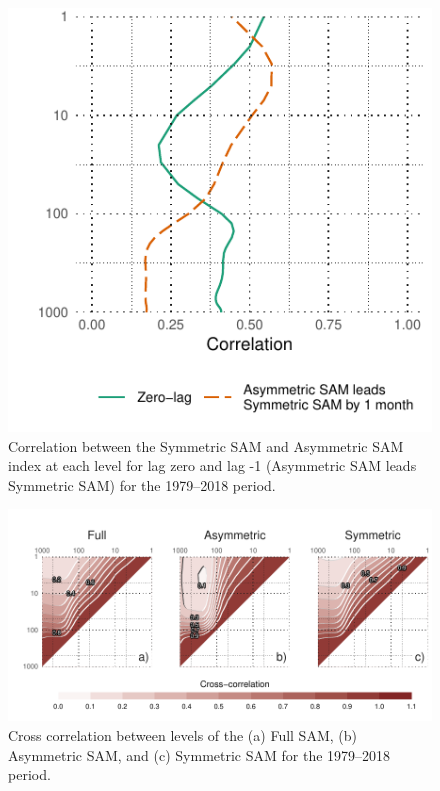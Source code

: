 \documentclass[]{ametsocV5}
\begin{document}
\begin{figure}
\includegraphics{cor-lev-1} \caption[Correlation between the Symmetric SAM and Asymmetric SAM index at each level for lag zero and lag -1 (Asymmetric SAM leads Symmetric SAM) for the 1979–2018 period]{Correlation between the Symmetric SAM and Asymmetric SAM index at each level for lag zero and lag -1 (Asymmetric SAM leads Symmetric SAM) for the 1979–2018 period.}\label{fig:cor-lev}
\end{figure}

\begin{figure}
\includegraphics{cross-correlation-1} \caption[Cross correlation between levels of the (a) Full SAM, (b) Asymmetric SAM, and (c) Symmetric SAM for the 1979–2018 period]{Cross correlation between levels of the (a) Full SAM, (b) Asymmetric SAM, and (c) Symmetric SAM for the 1979–2018 period.}\label{fig:cross-correlation}
\end{figure}
\end{document}
